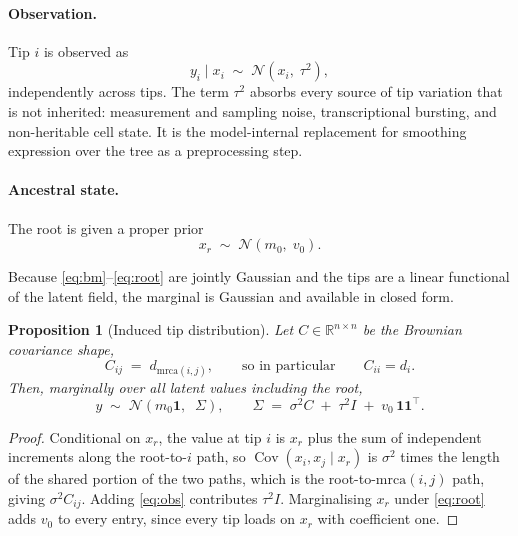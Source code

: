 \documentclass[11pt]{article}
\newtheorem{proposition}{Proposition}
\theoremstyle{remark}
\newcommand{\Norm}{\mathcal{N}}
\newcommand{\one}{\mathbf{1}}
\newcommand{\Rb}{\mathbb{R}}
\begin{document}
\paragraph{Observation.} Tip $i$ is observed as
\begin{equation}
  y_i \mid x_i \;\sim\; \Norm\!\left(x_i,\; \tau^2\right),
  \label{eq:obs}
\end{equation}
independently across tips. The term $\tau^2$ absorbs every source of tip variation that is not
inherited: measurement and sampling noise, transcriptional bursting, and non-heritable cell state.
It is the model-internal replacement for smoothing expression over the tree as a preprocessing step.

\paragraph{Ancestral state.} The root is given a proper prior
\begin{equation}
  x_r \;\sim\; \Norm\!\left(m_0,\; v_0\right).
  \label{eq:root}
\end{equation}

Because \eqref{eq:bm}--\eqref{eq:root} are jointly Gaussian and the tips are a linear functional of
the latent field, the marginal is Gaussian and available in closed form.

\begin{proposition}[Induced tip distribution]
\label{prop:marginal}
Let $C \in \Rb^{n \times n}$ be the Brownian covariance shape,
\begin{equation}
  C_{ij} \;=\; d_{\mathrm{mrca}(i,j)}, \qquad\text{so in particular}\qquad C_{ii} = d_i .
  \label{eq:C}
\end{equation}
Then, marginally over all latent values including the root,
\begin{equation}
  y \;\sim\; \Norm\!\left(m_0 \one,\;\; \Sigma\right),
  \qquad
  \Sigma \;=\; \sigma^2 C \;+\; \tau^2 I \;+\; v_0\, \one\one^{\!\top}.
  \label{eq:Sigma}
\end{equation}
\end{proposition}

\begin{proof}
Conditional on $x_r$, the value at tip $i$ is $x_r$ plus the sum of independent increments along the
root-to-$i$ path, so $\operatorname{Cov}(x_i, x_j \mid x_r)$ is $\sigma^2$ times the length of the
shared portion of the two paths, which is the root-to-$\mathrm{mrca}(i,j)$ path, giving $\sigma^2
C_{ij}$. Adding \eqref{eq:obs} contributes $\tau^2 I$. Marginalising $x_r$ under \eqref{eq:root}
adds $v_0$ to every entry, since every tip loads on $x_r$ with coefficient one.
\end{proof}
\end{document}
